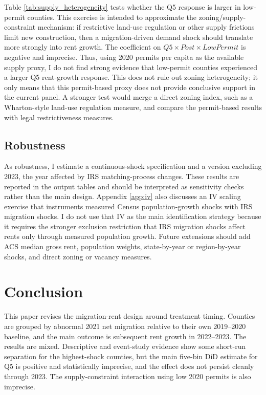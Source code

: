 \documentclass[11pt]{article}
\begin{document}


Table \ref{tab:supply_heterogeneity} tests whether the Q5 response is larger in low-permit counties. This exercise is intended to approximate the zoning/supply-constraint mechanism: if restrictive land-use regulation or other supply frictions limit new construction, then a migration-driven demand shock should translate more strongly into rent growth. The coefficient on $Q5\times Post\times LowPermit$ is negative and imprecise. Thus, using 2020 permits per capita as the available supply proxy, I do not find strong evidence that low-permit counties experienced a larger Q5 rent-growth response. This does not rule out zoning heterogeneity; it only means that this permit-based proxy does not provide conclusive support in the current panel. A stronger test would merge a direct zoning index, such as a Wharton-style land-use regulation measure, and compare the permit-based results with legal restrictiveness measures.

\subsection{Robustness}

As robustness, I estimate a continuous-shock specification and a version excluding 2023, the year affected by IRS matching-process changes. These results are reported in the output tables and should be interpreted as sensitivity checks rather than the main design. Appendix \ref{app:iv} also discusses an IV scaling exercise that instruments measured Census population-growth shocks with IRS migration shocks. I do not use that IV as the main identification strategy because it requires the stronger exclusion restriction that IRS migration shocks affect rents only through measured population growth. Future extensions should add ACS median gross rent, population weights, state-by-year or region-by-year shocks, and direct zoning or vacancy measures.

\section{Conclusion}

This paper revises the migration-rent design around treatment timing. Counties are grouped by abnormal 2021 net migration relative to their own 2019--2020 baseline, and the main outcome is subsequent rent growth in 2022--2023. The results are mixed. Descriptive and event-study evidence show some short-run separation for the highest-shock counties, but the main five-bin DiD estimate for Q5 is positive and statistically imprecise, and the effect does not persist cleanly through 2023. The supply-constraint interaction using low 2020 permits is also imprecise.
\end{document}
